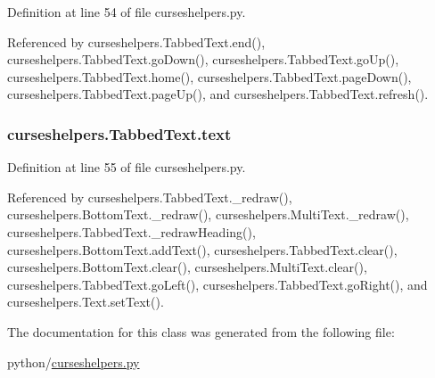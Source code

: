 Definition at line 54 of file curseshelpers.\-py.



Referenced by curseshelpers.\-Tabbed\-Text.\-end(), curseshelpers.\-Tabbed\-Text.\-go\-Down(), curseshelpers.\-Tabbed\-Text.\-go\-Up(), curseshelpers.\-Tabbed\-Text.\-home(), curseshelpers.\-Tabbed\-Text.\-page\-Down(), curseshelpers.\-Tabbed\-Text.\-page\-Up(), and curseshelpers.\-Tabbed\-Text.\-refresh().

\subsubsection[{text}]{\setlength{\rightskip}{0pt plus 5cm}curseshelpers.\-Tabbed\-Text.\-text}\label{classcurseshelpers_1_1TabbedText_aaf77caf316afc23cdd484c1b05f6320f}


Definition at line 55 of file curseshelpers.\-py.



Referenced by curseshelpers.\-Tabbed\-Text.\-\_\-redraw(), curseshelpers.\-Bottom\-Text.\-\_\-redraw(), curseshelpers.\-Multi\-Text.\-\_\-redraw(), curseshelpers.\-Tabbed\-Text.\-\_\-redraw\-Heading(), curseshelpers.\-Bottom\-Text.\-add\-Text(), curseshelpers.\-Tabbed\-Text.\-clear(), curseshelpers.\-Bottom\-Text.\-clear(), curseshelpers.\-Multi\-Text.\-clear(), curseshelpers.\-Tabbed\-Text.\-go\-Left(), curseshelpers.\-Tabbed\-Text.\-go\-Right(), and curseshelpers.\-Text.\-set\-Text().



The documentation for this class was generated from the following file\-:\begin{DoxyCompactItemize}
\item 
python/\hyperlink{curseshelpers_8py}{curseshelpers.\-py}\end{DoxyCompactItemize}
